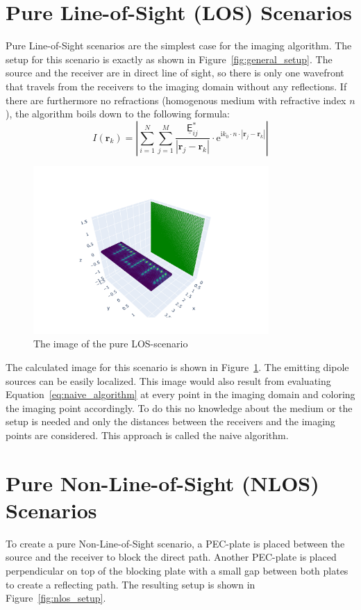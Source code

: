 \section{Pure Line-of-Sight (LOS) Scenarios}
Pure Line-of-Sight scenarios are the simplest case for the imaging algorithm.
The setup for this scenario is exactly as shown in Figure~\ref{fig:general_setup}.
The source and the receiver are in direct line of sight, so there is only one wavefront that travels from the receivers to the imaging domain without any reflections.
If there are furthermore no refractions (homogenous medium with refractive index \(n\)), the algorithm boils down to the following formula:
\begin{equation}\label{eq:naive_algorithm}
    I(\bm{r}_k) = |\sum_{i=1}^{N} \sum_{j=1}^{M} \frac{\underline{\mathsf{E}}_{ij}^*}{|\bm{r}_j - \bm{r}_k|} \cdot \mathrm{e}^{\mathrm{i}k_0\cdot n \cdot |\bm{r}_j - \bm{r}_k|}|
\end{equation}

\begin{figure}[ht]
    \centering
    \includegraphics[width=0.8\textwidth]{figures/los_result.pdf}
    \caption{The image of the pure LOS-scenario}\label{fig:los_results}
\end{figure}

The calculated image for this scenario is shown in Figure~\ref{fig:los_results}.
The emitting dipole sources can be easily localized.
This image would also result from evaluating Equation~\eqref{eq:naive_algorithm} at every point in the imaging domain and coloring the imaging point accordingly.
To do this no knowledge about the medium or the setup is needed and only the distances between the receivers and the imaging points are considered.
This approach is called the naive algorithm.


\section{Pure Non-Line-of-Sight (NLOS) Scenarios}
To create a pure Non-Line-of-Sight scenario, a PEC-plate is placed between the source and the receiver to block the direct path.
Another PEC-plate is placed perpendicular on top of the blocking plate with a small gap between both plates to create a reflecting path.
The resulting setup is shown in Figure~\ref{fig:nlos_setup}.

